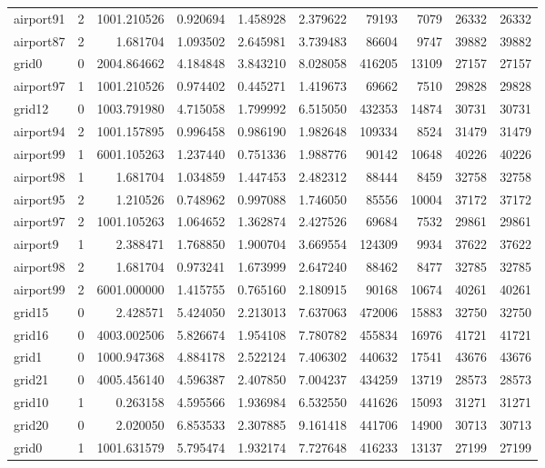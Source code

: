 \begin{longtable}{|l|r|r|r|r|r|r|r|r|r|}
airport91 & 2 & 1001.210526 & 0.920694 & 1.458928 & 2.379622 & 79193 & 7079 & 26332 & 26332 \\
airport87 & 2 & 1.681704 & 1.093502 & 2.645981 & 3.739483 & 86604 & 9747 & 39882 & 39882 \\
grid0 & 0 & 2004.864662 & 4.184848 & 3.843210 & 8.028058 & 416205 & 13109 & 27157 & 27157 \\
airport97 & 1 & 1001.210526 & 0.974402 & 0.445271 & 1.419673 & 69662 & 7510 & 29828 & 29828 \\
grid12 & 0 & 1003.791980 & 4.715058 & 1.799992 & 6.515050 & 432353 & 14874 & 30731 & 30731 \\
airport94 & 2 & 1001.157895 & 0.996458 & 0.986190 & 1.982648 & 109334 & 8524 & 31479 & 31479 \\
airport99 & 1 & 6001.105263 & 1.237440 & 0.751336 & 1.988776 & 90142 & 10648 & 40226 & 40226 \\
airport98 & 1 & 1.681704 & 1.034859 & 1.447453 & 2.482312 & 88444 & 8459 & 32758 & 32758 \\
airport95 & 2 & 1.210526 & 0.748962 & 0.997088 & 1.746050 & 85556 & 10004 & 37172 & 37172 \\
airport97 & 2 & 1001.105263 & 1.064652 & 1.362874 & 2.427526 & 69684 & 7532 & 29861 & 29861 \\
airport9 & 1 & 2.388471 & 1.768850 & 1.900704 & 3.669554 & 124309 & 9934 & 37622 & 37622 \\
airport98 & 2 & 1.681704 & 0.973241 & 1.673999 & 2.647240 & 88462 & 8477 & 32785 & 32785 \\
airport99 & 2 & 6001.000000 & 1.415755 & 0.765160 & 2.180915 & 90168 & 10674 & 40261 & 40261 \\
grid15 & 0 & 2.428571 & 5.424050 & 2.213013 & 7.637063 & 472006 & 15883 & 32750 & 32750 \\
grid16 & 0 & 4003.002506 & 5.826674 & 1.954108 & 7.780782 & 455834 & 16976 & 41721 & 41721 \\
grid1 & 0 & 1000.947368 & 4.884178 & 2.522124 & 7.406302 & 440632 & 17541 & 43676 & 43676 \\
grid21 & 0 & 4005.456140 & 4.596387 & 2.407850 & 7.004237 & 434259 & 13719 & 28573 & 28573 \\
grid10 & 1 & 0.263158 & 4.595566 & 1.936984 & 6.532550 & 441626 & 15093 & 31271 & 31271 \\
grid20 & 0 & 2.020050 & 6.853533 & 2.307885 & 9.161418 & 441706 & 14900 & 30713 & 30713 \\
grid0 & 1 & 1001.631579 & 5.795474 & 1.932174 & 7.727648 & 416233 & 13137 & 27199 & 27199 \\

\end{longtable}
